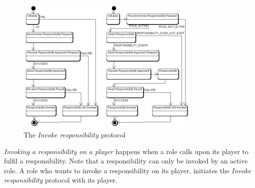 \begin{figure}[ht]
	\centering
	\includegraphics[width=0.8\textwidth]{images/thespian/invoke-responsibility-protocol}
	\caption{The \textit{Invoke responsibility} protocol}
	\label{figure:thespian-invoke-responsibility-protocol}
\end{figure}

\textit{Invoking a responsibility on a player} happens when a role calls upon its player to fulfil a responsibility.
Note that a responsibility can only be invoked by an active role.
A role who wants to invoke a responsibility on its player, initiates the \textit{Invoke responsibility} protocol with its player.

